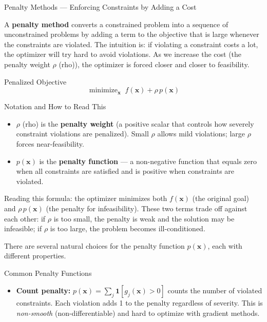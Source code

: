 \documentclass[aspectratio=169,10pt]{beamer}
\newcommand{\bx}{\mathbf{x}}
\DeclareMathOperator*{\minimize}{minimize}
\begin{document}
\begin{frame}[allowframebreaks]{Penalty Methods --- Enforcing Constraints by Adding a Cost}

  A \textbf{penalty method} converts a constrained problem into a sequence of
  unconstrained problems by adding a term to the objective that is large
  whenever the constraints are violated.  The intuition is: if violating
  a constraint costs a lot, the optimizer will try hard to avoid violations.
  As we increase the cost (the penalty weight $\rho$ (rho)), the optimizer
  is forced closer and closer to feasibility.

  \begin{block}{Penalized Objective}
    \[
      \minimize_{\bx}\; f(\bx) + \rho\,p(\bx)
    \]
  \end{block}

  \begin{block}{Notation and How to Read This}
    \begin{itemize}
      \item $\rho$ (rho) is the \textbf{penalty weight} (a positive scalar that
            controls how severely constraint violations are penalized).  Small
            $\rho$ allows mild violations; large $\rho$ forces near-feasibility.
      \item $p(\bx)$ is the \textbf{penalty function} --- a non-negative
            function that equals zero when all constraints are satisfied and
            is positive when constraints are violated.
    \end{itemize}
    Reading this formula: the optimizer minimizes both $f(\bx)$ (the original
    goal) and $\rho\, p(\bx)$ (the penalty for infeasibility).  These two
    terms trade off against each other: if $\rho$ is too small, the penalty is
    weak and the solution may be infeasible; if $\rho$ is too large, the
    problem becomes ill-conditioned.
  \end{block}

  \framebreak

  There are several natural choices for the penalty function $p(\bx)$, each
  with different properties.

  \begin{block}{Common Penalty Functions}
    \begin{itemize}
      \item \textbf{Count penalty:} $p(\bx) = \sum_j \mathbf{1}[g_j(\bx) > 0]$
            counts the number of violated constraints.  Each violation adds 1
            to the penalty regardless of severity.  This is \emph{non-smooth}
            (non-differentiable) and hard to optimize with gradient methods.


\end{itemize}
\end{block}
\end{frame}
\end{document}
